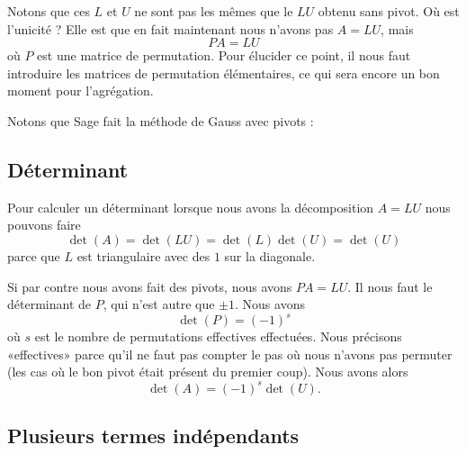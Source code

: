 Notons que ces \( L\) et \( U\) ne sont pas les mêmes que le \( L U\) obtenu sans pivot. Où est l'unicité ? Elle est que en fait maintenant nous n'avons pas \( A=LU\), mais
\begin{equation}
    PA=LU
\end{equation}
où \( P\) est une matrice de permutation. Pour élucider ce point, il nous faut introduire les matrices de permutation élémentaires, ce qui sera encore un bon moment pour l'agrégation.

Notons que Sage fait la méthode de Gauss avec pivots :


\subsection{Déterminant}

Pour calculer un déterminant lorsque nous avons la décomposition \( A=LU\) nous pouvons faire
\begin{equation}
    \det(A)=\det(LU)=\det(L)\det(U)=\det(U)
\end{equation}
parce que \( L\) est triangulaire avec des \( 1\) sur la diagonale.

Si par contre nous avons fait des pivots, nous avons \( PA=LU\). Il nous faut le déterminant de \( P\), qui n'est autre que \( \pm 1\). Nous avons
\begin{equation}
    \det(P)=(-1)^s
\end{equation}
où \( s\) est le nombre de permutations effectives effectuées. Nous précisons «effectives» parce qu'il ne faut pas compter le pas où nous n'avons pas permuter (les cas où le bon pivot était présent du premier coup). Nous avons alors
\begin{equation}
    \det(A)=(-1)^s\det(U).
\end{equation}

\subsection{Plusieurs termes indépendants}

